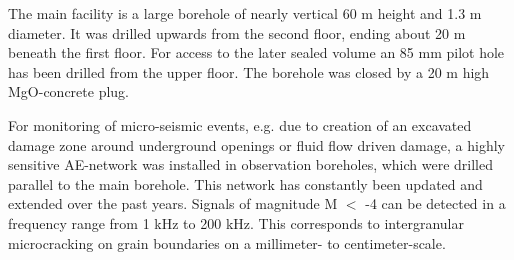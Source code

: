 The main facility is a large borehole of nearly vertical 60 m height and 1.3 m diameter. It was drilled upwards from the second floor, ending about 20 m beneath the first floor. For access to the later sealed volume an 85 mm pilot hole has been drilled from the upper floor. The borehole was closed by a 20 m high MgO-concrete plug. 

For monitoring of micro-seismic events, e.g. due to creation of an excavated damage zone around underground openings or fluid flow driven damage, a highly sensitive AE-network was installed in observation boreholes, which were drilled parallel to the main borehole. This network has constantly been updated and extended over the past years. Signals of magnitude M $<$ -4 can be detected in a frequency range from 1 kHz to 200 kHz. This corresponds to intergranular microcracking on grain boundaries on a millimeter- to centimeter-scale. 

